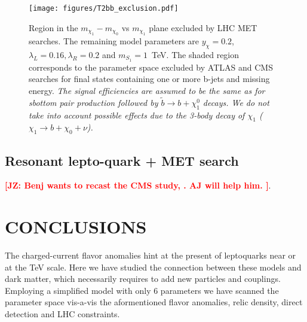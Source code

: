 \documentclass[11pt]{cernrep}
\def\JZ#1{{\bf  \textcolor{red}{[JZ: {#1}]}}}
\begin{document}
\begin{figure}[!h]
	\centering
	\texttt{[image: figures/T2bb\_exclusion.pdf]}
	\caption{Region in the $m_{\chi_1} - m_{\chi_0}$ vs $m_{\chi_1}$ plane excluded by LHC MET searches. The remaining model parameters are $y_{\chi} = 0.2$, $\lambda_L = 0.16, \lambda_R = 0.2$ and $m_{S_1} = 1$~TeV. The shaded region corresponds to the parameter space excluded by ATLAS and CMS searches for final states containing one or more b-jets and missing energy. {\it The signal efficiencies are assumed to be the same as for sbottom pair production followed by $\tilde{b} \to b + \chi_1^0$ decays. We do not take into account possible effects due to the 3-body decay of $\chi_1$ ($\chi_1 \to b + \chi_0 + \nu$).}
		\label{fig:T2bbexcl}
	}
\end{figure}



\subsection{Resonant lepto-quark + MET search}

\JZ{Benj wants to recast the CMS study, \cite{Sirunyan:2018xtm}. AJ will help him. }.


%
% 
 

\section{CONCLUSIONS}
The charged-current flavor anomalies hint at the present of leptoquarks near or at the TeV scale. Here we have studied the connection between these models and dark matter, which necessarily requires to add new particles and couplings. Employing a simplified model with only 6 parameters we have scanned the parameter space vis-a-vis the aformentioned flavor anomalies, relic density, direct detection and LHC constraints.
\end{document}
